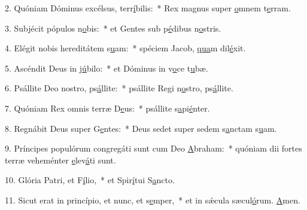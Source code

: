 2. Quóniam Dóminus excélsus, terr\uline{í}bilis:~* Rex magnus super \uline{o}mnem t\uline{e}rram.\par 
3. Subjécit pópulos n\uline{o}bis:~* et Gentes sub p\uline{é}dibus n\uline{o}stris.\par 
4. Elégit nobis hereditátem s\uline{u}am:~* spéciem Jacob, \uline{qua}m dil\uline{é}xit.\par 
5. Ascéndit Deus in j\uline{ú}bilo:~* et Dóminus in v\uline{o}ce t\uline{u}bæ.\par 
6. Psállite Deo nostro, ps\uline{á}llite:~* psállite Regi n\uline{o}stro, ps\uline{á}llite.\par 
7. Quóniam Rex omnis terræ D\uline{e}us:~* psállite s\uline{a}pi\uline{é}nter.\par 
8. Regnábit Deus super G\uline{e}ntes:~* Deus sedet super sedem s\uline{a}nctam s\uline{u}am.\par 
9. Príncipes populórum congregáti sunt cum Deo \uline{A}braham:~* quóniam dii fortes terræ veheménter \uline{e}lev\uline{á}ti sunt.\par 
10. Glória Patri, et F\uline{í}lio,~* et Spir\uline{í}tui S\uline{a}ncto.\par 
11. Sicut erat in princípio, et nunc, et s\uline{e}mper,~* et in sǽcula sæcul\uline{ó}rum. \uline{A}men.\par 
